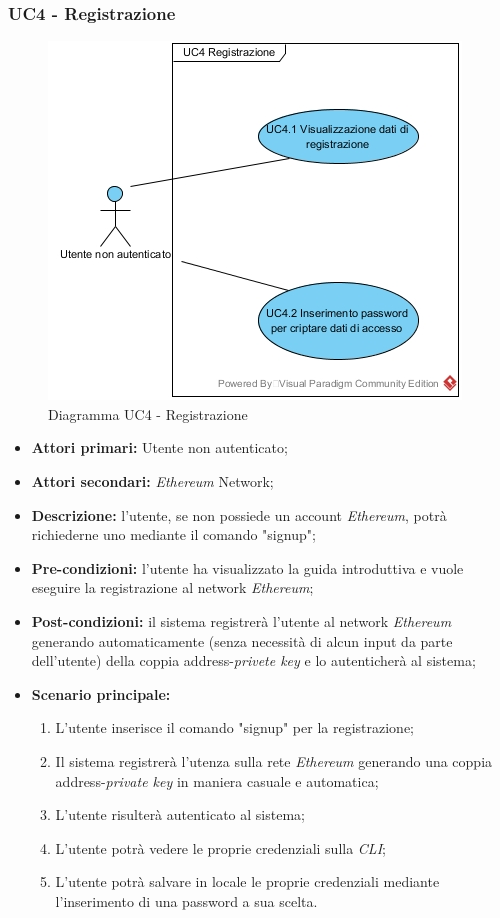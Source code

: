 \subsubsection{UC4 - Registrazione}
\begin{figure}[h]
	\centering
	\includegraphics[width=0.7\linewidth]{res/img/UC4.jpg}
	\caption{Diagramma UC4 - Registrazione}
\end{figure}
\begin{itemize}
	\item \textbf{Attori primari:} Utente non autenticato;
	\item \textbf{Attori secondari:} \textit{Ethereum\glo} Network;
	\item \textbf{Descrizione:} l'utente, se non possiede un account \textit{Ethereum\glos}, potrà richiederne uno mediante il comando "signup"; 
	\item \textbf{Pre-condizioni:} l'utente ha visualizzato la guida introduttiva e vuole eseguire la registrazione al network \textit{Ethereum\glos};
	\item \textbf{Post-condizioni:} il sistema registrerà l'utente al network \textit{Ethereum\glo} generando automaticamente (senza necessità di alcun input da parte dell'utente) della coppia address-\textit{privete key\glo} e lo autenticherà al sistema;
	\item \textbf{Scenario principale:} 
	\begin{enumerate}
		\item L'utente inserisce il comando "signup" per la registrazione;
		\item Il sistema registrerà l'utenza sulla rete \textit{Ethereum\glos} generando una coppia address-\textit{private key\glo} in maniera casuale e automatica;
		\item L'utente risulterà autenticato al sistema;
		\item L'utente potrà vedere le proprie credenziali sulla \textit{CLI\glos};
		\item L'utente potrà salvare in locale le proprie credenziali mediante l'inserimento di una password a sua scelta.
	\end{enumerate} 
\end{itemize}